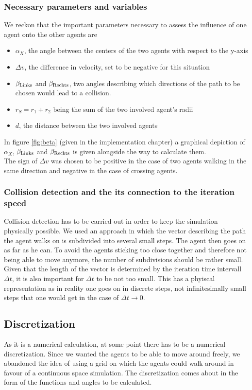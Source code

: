 \subsubsection{Necessary parameters and variables}
We reckon that the important parameters necessary to assess the influence of one agent onto the other agents are
\begin{itemize}
	\item $\alpha_X$, the angle between the centers of the two agents with respect to the y-axis
	\item $\Delta v$, the difference in velocity, set to be negative for this situation
	\item $\beta_{\text{Links}}$ and $\beta_{\text{Rechts}}$, two angles describing which directions of the path to be chosen would lead to a collision.
	\item $r_S = r_1 + r_2$ being the sum of the two involved agent's radii
	\item $d$, the distance between the two involved agents
\end{itemize}
\noi In figure \ref{fig:beta} (given in the implementation chapter) a graphical depiction of $\alpha_X$, $\beta_{\text{Links}}$ and $\beta_{\text{Rechts}}$ is given alongside the way to calculate them.\\
The sign of $\Delta v$ was chosen to be positive in the case of two agents walking in the same direction and negative in the case of crossing agents.\\

\subsubsection{Collision detection and the its connection to the iteration speed}
Collision detection has to be carried out in order to keep the simulation physically possible. We used an approach in which the vector describing the path the agent walks on is subdivided into several small steps. The agent then goes on as far as he can. To avoid the agents sticking too close together and therefore not being able to move anymore, the number of subdivisions should be rather small.\\
Given that the length of the vector is determined by the iteration time intervall $\Delta t$, it is also important for $\Delta t$ to be not too small. This has a phyiscal representation as in reality one goes on in discrete steps, not infinitesimally small steps that one would get in the case of $\Delta t \rightarrow 0$.

\subsection{Discretization}
As it is a numerical calculation, at some point there has to be a numerical discretization. Since we wanted the agents to be able to move around freely, we abandoned the idea of using a grid on which the agents could walk around in favour of a continuous space simulation. The discretization comes about in the form of the functions and angles to be calculated.

